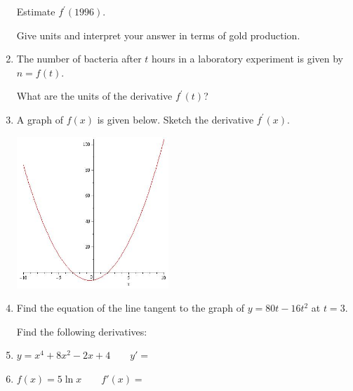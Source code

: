 \documentclass[12pt]{amsart}
\begin{document}
\begin{enumerate}
\vspace{.25in}

Estimate $f^{ \prime}(1996)$.     \underline{\hspace {1in}}

\vspace{.3in}

Give units and interpret your answer in terms of gold production.

\vspace {.5in}

\item %

The number of bacteria after $t$ hours in a laboratory experiment is given by $n=f(t)$.

What are the units of the derivative $f^{\prime}(t)$?


\vspace {1in}

\item %
A graph of $f(x)$ is given below.  Sketch the derivative $f^{ \prime}(x)$.

\includegraphics [width=2.25in]{graphpbm11ex}

\vspace {.3in}


\item %

Find the equation of the line tangent to the graph of $y=80t-16t^2$ at $t=3$.

\vspace{1in}



Find the following derivatives:

\item %
$y=x^4+8x^2-2x+4 \qquad y'=$\underline{\hspace {1in}}

\vspace{.5in}

\item %
$f(x)=5\ln x \qquad f'(x)=$ \underline{\hspace {1in}}

\vspace{.5in}


\end{enumerate}
\end{document}
